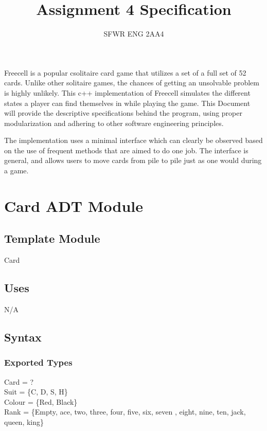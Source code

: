 \documentclass[12pt]{article}
\title{Assignment 4 Specification}
\author{SFWR ENG 2AA4}
\begin{document}
\maketitle

Freecell is a popular csolitaire card game that utilizes a set of a full set of 52 cards. Unlike other solitaire games, the chances of getting an unsolvable problem is highly unlikely. This c++ implementation of Freecell  simulates the different states a player can find themselves in while playing the game. This Document will provide the descriptive specifications behind the program, using proper modularization and adhering to other software engineering principles.

The implementation uses a minimal interface which can clearly be observed based on the use of frequent methods that are aimed to do one job. The interface is general, and allows users to move cards from pile to pile just as one would during a game.

\newpage


\section* {Card ADT Module}

\subsection*{Template Module}

Card

\subsection* {Uses}

N/A

\subsection* {Syntax}

\subsubsection* {Exported Types}

Card = ?\\
Suit = \{C, D, S, H\}\\
Colour = \{Red, Black\}\\
Rank = \{Empty, ace, two, three, four, five, six, seven , eight, nine, ten, jack, queen, king\}\\
\end{document}
